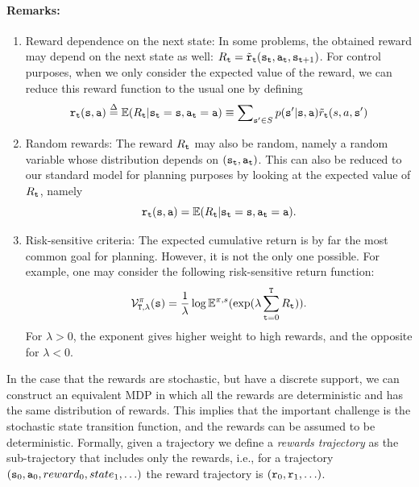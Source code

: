 \paragraph{Remarks:}
\begin{enumerate}
  \item Reward dependence on the next state:  In some problems, the obtained reward may depend on the next state as well: ${R_{\tt t}} = {\tilde {{\tt r}}_{\tt t}}({{\tt s}_{\tt t}},{{\tt a}_{\tt t}},{{\tt s}_{{\tt t} + 1}})$.  For control purposes, when we only consider the expected value of the reward, we can reduce this reward function to the usual one by defining
\[{\reward_\ttime}(\state,\action) \buildrel \Delta \over = \E({R_\ttime}|{\state_\ttime} = \state,{\action_\ttime} = \action) \equiv \sum\nolimits_{\state' \in S} {p(\state'|\state,\action){{\tilde r}_\ttime}(} s,a,\state')\]
  \item Random rewards:  The reward ${R_{\tt t}}$ may also be random, namely a random variable whose distribution depends on $({{\tt s}_{\tt t}},{{\tt a}_{\tt t}})$.  This can also be reduced to our standard model for planning purposes by looking at the expected value of ${R_{\tt t}}$, namely \[{{\tt r}_{\tt t}}({\tt s},{\tt a}) = \mathbb{E}({R_{\tt t}}|{{\tt s}_{\tt t}} = {\tt s},{{\tt a}_{\tt t}} =
  {\tt a}).\]
  \item Risk-sensitive criteria: The expected cumulative return is by far the most common goal for planning. However, it is not the only one possible. For example, one may consider the following risk-sensitive  return function:
\[\mathcal{V}_{{{\tt T},\lambda }}^\pi ({\tt s}) = \frac{1}{\lambda }\log {\ensuremath{\mathbb{E}}^{\pi,s}}(\exp (\lambda \sum\limits_{{\tt t} = 0}^{\tt T} {{R_{\tt t}}} )).\]
For $\lambda  > 0$, the exponent gives higher weight to high rewards, and the opposite for $\lambda  < 0$.
\end{enumerate}

In the case that the rewards are stochastic, but have a discrete
support, we can construct an equivalent MDP in which all the rewards
are deterministic and has the same distribution of rewards. This
implies that the important challenge is the stochastic state
transition function, and the rewards can be assumed to be
deterministic.
%
Formally, given a trajectory we define a {\em rewards trajectory} as
the sub-trajectory that includes only the rewards, i.e., for a trajectory $({\tt s}_0,{\tt a}_0,reward_0,state_1, \ldots)$ the reward trajectory is  $({\tt r}_0, {\tt r}_1, \ldots)$.



